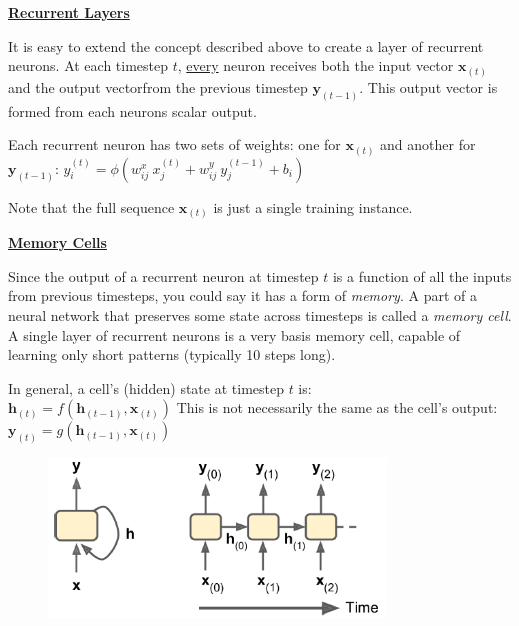 \newpage
\textbf{\underline{Recurrent Layers}}

It is easy to extend the concept described above to create a layer of recurrent neurons.\newline
At each timestep $t$, \underline{every} neuron receives both the input vector $\boldsymbol{x}_{(t)}$
and the output vector\newline from the previous timestep $\boldsymbol{y}_{(t-1)}$.
This output vector is formed from each neurons scalar output.

Each recurrent neuron has two sets of weights: one for $\boldsymbol{x}_{(t)}$ and another for $\boldsymbol{y}_{(t-1)}$:\newline
$y^{(t)}_i = \phi (w^x_{ij} \: x^{(t)}_j + w^y_{ij} \: y^{(t-1)}_j + b_i)$

Note that the full sequence $\boldsymbol{x}_{(t)}$ is just a single training instance.\newline

\textbf{\underline{Memory Cells}}

Since the output of a recurrent neuron at timestep $t$ is a function of all the inputs from previous timesteps,
you could say it has a form of \textit{memory}.
A part of a neural network that preserves some state across timesteps is called a \textit{memory cell}.
% 
A single layer of recurrent neurons is a very basis memory cell,
capable of learning only short patterns (typically 10 steps long).

In general, a cell's (hidden) state at timestep $t$ is:~~~~~~$\boldsymbol{h}_{(t)} = f(\boldsymbol{h}_{(t-1)}, \boldsymbol{x}_{(t)})$\newline
This is not necessarily the same as the cell's output: $\boldsymbol{y}_{(t)} = g(\boldsymbol{h}_{(t-1)}, \boldsymbol{x}_{(t)})$\newline

\begin{figure}[ht]
\centering
\includegraphics[width=0.80\textwidth]{./images/memory_cells.png}
\end{figure}

